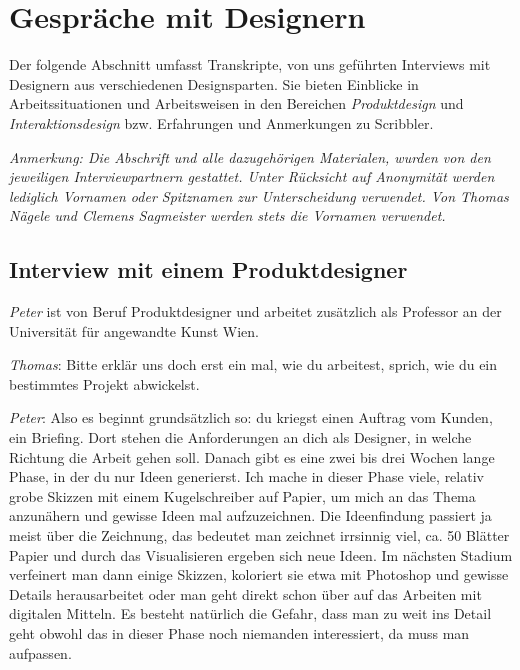 
\chapter{Gespr{\"a}che mit Designern}\label{cha:interviews}
Der folgende Abschnitt umfasst Transkripte, von uns geführten Interviews mit Designern aus verschiedenen Designsparten. Sie bieten Einblicke in Arbeitssituationen und Arbeitsweisen in den Bereichen \emph{Produktdesign} und \emph{Interaktionsdesign} bzw. Erfahrungen und Anmerkungen zu Scribbler.

\medskip \emph{Anmerkung: Die Abschrift und alle dazugehörigen Materialen, wurden von den jeweiligen Interviewpartnern gestattet. Unter Rücksicht auf Anonymität werden lediglich Vornamen oder Spitznamen zur Unterscheidung verwendet. Von Thomas Nägele und Clemens Sagmeister werden stets die Vornamen verwendet.}

\section{Interview mit einem Produktdesigner}
\emph{Peter} ist von Beruf Produktdesigner und arbeitet zusätzlich als Professor an der Universität für angewandte Kunst Wien. 

\medskip \emph{Thomas}: Bitte erklär uns doch erst ein mal, wie du arbeitest, sprich, wie du ein bestimmtes Projekt abwickelst.

\medskip \emph{Peter}: Also es beginnt grundsätzlich so: du kriegst einen Auftrag vom Kunden, ein Briefing. Dort stehen die Anforderungen an dich als Designer, in welche Richtung die Arbeit gehen soll. Danach gibt es eine zwei bis drei Wochen lange Phase, in der du nur Ideen generierst. Ich mache in dieser Phase viele, relativ grobe Skizzen mit einem Kugelschreiber auf Papier, um mich an das Thema anzunähern und gewisse Ideen mal aufzuzeichnen. Die Ideenfindung passiert ja meist über die Zeichnung, das bedeutet man zeichnet irrsinnig viel, ca. 50 Blätter Papier und durch das Visualisieren ergeben sich neue Ideen. Im nächsten Stadium verfeinert man dann einige Skizzen, koloriert sie etwa mit Photoshop und gewisse Details herausarbeitet oder man geht direkt schon über auf das Arbeiten mit digitalen Mitteln. Es besteht natürlich die Gefahr, dass man zu weit ins Detail geht obwohl das in dieser Phase noch niemanden interessiert, da muss man aufpassen. 

